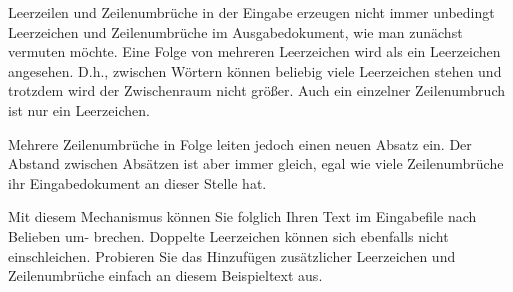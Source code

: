 Leerzeilen und Zeilenumbrüche in der Eingabe erzeugen nicht immer unbedingt Leerzeichen
und Zeilenumbrüche im Ausgabedokument, wie man zunächst vermuten möchte. Eine Folge von mehreren Leerzeichen wird als ein Leerzeichen angesehen. D.h., zwischen Wörtern können beliebig viele Leerzeichen stehen und trotzdem wird der Zwischenraum nicht größer. Auch ein
einzelner Zeilenumbruch ist nur ein Leerzeichen.


Mehrere Zeilenumbrüche in Folge leiten jedoch einen neuen Absatz ein. Der Abstand zwischen
Absätzen ist aber immer gleich, egal wie viele Zeilenumbrüche ihr Eingabedokument an dieser
Stelle hat.


Mit diesem Mechanismus können Sie folglich Ihren Text im Eingabefile nach Belieben um-
brechen. Doppelte Leerzeichen können sich ebenfalls nicht einschleichen. Probieren Sie das
Hinzufügen zusätzlicher Leerzeichen und Zeilenumbrüche einfach an diesem Beispieltext aus.